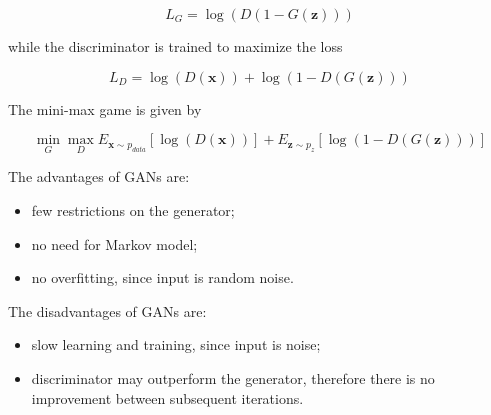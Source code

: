 \documentclass[a4paper, 12pt]{article}
\begin{document}
\begin{equation}
L_G = \log \left( D (1-G(\mathbf{z})) \right)
\end{equation}

while the discriminator is trained to maximize the loss

\begin{equation}
L_D = \log \left( D(\mathbf{x}) \right) + \log \left( 1- D (G(\mathbf{z})) \right)
\end{equation}

The mini-max game is given by

\begin{equation}
\min\limits_{G} \max\limits_{D} E_{\mathbf{x} \sim p_{data}} \left[ \log \left( D(\mathbf{x}) \right) \right] + E_{\mathbf{z} \sim p_{z}} \left[ \log \left( 1 - D(G(\mathbf{z})) \right) \right]
\end{equation}

The advantages of GANs are:

\begin{itemize}
	\item few restrictions on the generator;
	\item no need for Markov model;
	\item no overfitting, since input is random noise.
\end{itemize}

The disadvantages of GANs are:

\begin{itemize}
	\item slow learning and training, since input is noise;
	\item discriminator may outperform the generator, therefore there is no improvement between subsequent iterations.
\end{itemize}
\end{document}
